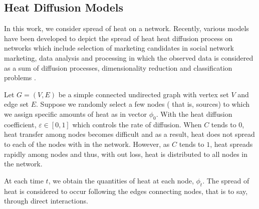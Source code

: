 \documentclass[10pt,a4paper]{article}
\begin{document}
    \subsection{Heat Diffusion Models}
    In this work, we consider spread of heat on a network. Recently, various models have been developed to depict the spread of heat heat diffusion process on networks which include selection of marketing candidates in social network marketing, data analysis and processing in which the observed data is considered as a sum of diffusion processes, dimensionality reduction and classification problems   \citep{ma2008mining,thanou2017learning,belkin2003laplacian}.
    
    Let $G=(V,E)$ be a simple connected undirected graph with vertex set $V$ and edge set $E$. Suppose we randomly select a few nodes ( that is, sources) to which we assign specific amounts of heat as in vector $\phi_0$. With the heat diffusion coefficient, $\varepsilon \in [0,1]$ which controls the rate of diffusion. When $C$ tends to $0$, heat transfer among nodes becomes difficult and as a result, heat does not spread to each of the nodes with in the network. However, as $C$ tends to $1$, heat spreads rapidly among nodes and thus, with out loss, heat is distributed to all nodes in the network.
    
   At each time $t$, we obtain the quantities of heat at each node, $\phi_t$. The spread of heat is considered to occur following the edges connecting nodes, that is to say, through direct interactions.  
    	
\end{document}
